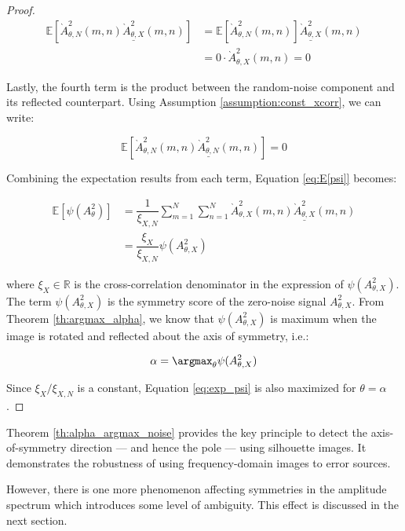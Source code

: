 \begin{proof}
\begin{align}
    \mathbb{E}\left[ \grave{A}^2_{\theta,N}(m,n) \underline{\grave{A}^2_{\theta,X}}(m,n) \right] &= \mathbb{E}\left[ \grave{A}^2_{\theta,N}(m,n) \right] \underline{\grave{A}^2_{\theta,X}}(m,n) \\
 &= 0 \cdot \grave{A}^2_{\theta,X}(m,n) = 0
\end{align}

Lastly, the fourth term is the product between the random-noise component and its reflected counterpart. Using Assumption \ref{assumption:const_xcorr}, we can write:

\begin{equation}
    \mathbb{E}\left[ \grave{A}^2_{\theta,N}(m,n) \underline{\grave{A}^2_{\theta,N}}(m,n) \right] = 0
\end{equation}

Combining the expectation results from each term, Equation \ref{eq:E[psi]} becomes:

\begin{align}
\label{eq:exp_psi}
    \mathbb{E}\left[ \psi(A^2_\theta) \right] &= \dfrac{1}{\xi_{X,N}} \sum_{m=1}^N \sum_{n=1}^N \grave{A}^2_{\theta,X}(m,n) \underline{\grave{A}^2_{\theta,X}}(m,n)\\
    &= \dfrac{\xi_X}{\xi_{X,N}} \psi(A_{\theta,X}^2)
\end{align}

where $\xi_X \in \mathbb{R}$ is the cross-correlation denominator in the expression of $\psi(A_{\theta,X}^2)$. The term $\psi(A_{\theta,X}^2)$ is the symmetry score of the zero-noise signal $A_{\theta,X}^2$. From Theorem \ref{th:argmax_alpha}, we know that $\psi(A_{\theta,X}^2)$ is maximum when the image is rotated and reflected about the axis of symmetry, i.e.:

\begin{equation}
    \alpha = \argmax_\theta \psi(A_{\theta,X}^2)
\end{equation}

Since $\xi_X/\xi_{X,N}$ is a constant, Equation \ref{eq:exp_psi} is also maximized for $\theta=\alpha$.
\end{proof}

Theorem \ref{th:alpha_argmax_noise} provides the key principle to detect the axis-of-symmetry direction --- and hence the pole --- using silhouette images. It demonstrates the robustness of using frequency-domain images to error sources.

However, there is one more phenomenon affecting symmetries in the amplitude spectrum which introduces some level of ambiguity. This effect is discussed in the next section.

